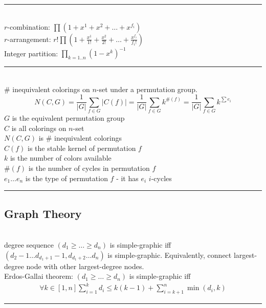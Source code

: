 \documentclass[10pt,letterpaper,landscape]{article}
\begin{document}
\begin{multicols}{2}
\noindent\rule{\linewidth}{1pt}

 \\ %
$r$-combination: $\prod{(1 + x^1 + x^2 + \hdots + x^{f_i})}$ \\
$r$-arrangement: $r! \prod{(1 + \frac{x^1}{1!} + \frac{x^2}{2!} + \hdots + \frac{x^{f_i}}{f_i!})}$ \\
Integer partition: $\prod_{k = 1..n}{(1-x^k)^{-1}}$

\noindent\rule{\linewidth}{1pt}

 \\
\# inequivalent colorings on $n$-set under a permutation group. 
\begin{equation*}
	N(C,G) = \frac{1}{|G|} \sum_{f \in G}{|C(f)|} = \frac{1}{|G|} \sum_{f \in G}{k^{\#(f)}} = \frac{1}{|G|} \sum_{f \in G}{k^{\sum{e_i}}}
\end{equation*}
$G$ is the equivalent permutation group \\
$C$ is all colorings on $n$-set \\
$N(C,G)$ is \# inequivalent colorings \\
$C(f)$ is the stable kernel of permutation $f$ \\
$k$ is the number of colors available \\
$\#(f)$ is the number of cycles in permutation $f$ \\
$e_1 \hdots e_n$ is the type of permutation $f$ - it has $e_i$ $i$-cycles 

\noindent\rule{\linewidth}{1pt}

\subsection{Graph Theory}

 \\ degree sequence $(d_1 \ge \hdots \ge d_n)$ is simple-graphic iff $(d_2-1 \hdots d_{d_1+1}-1, d_{d_1+2} \hdots d_n)$ is simple-graphic. Equivalently, connect largest-degree node with other largest-degree nodes. \\
Erdos-Gallai theorem: $(d_1 \ge \hdots \ge d_n)$ is simple-graphic iff
\begin{align*}
	\forall k \in [1,n] \sum_{i=1}^{k}{d_i} \le k(k-1) + \sum_{i=k+1}^{n}{\min{(d_i, k)}}
\end{align*}

\noindent\rule{\linewidth}{1pt}


\end{multicols}
\end{document}
